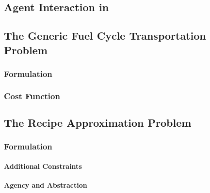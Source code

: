 


\subsection{Agent Interaction in \Cyclus}\label{sec:agent-interaction}


\subsection{The Generic Fuel Cycle Transportation Problem}\label{sec:gfctp}

\subsubsection{Formulation}



\subsubsection{Cost Function}\label{sec:cost-function}




\subsection{The Recipe Approximation Problem}\label{sec:rap}



\subsubsection{Formulation}



\paragraph{Additional Constraints}



\paragraph{Agency and Abstraction}



